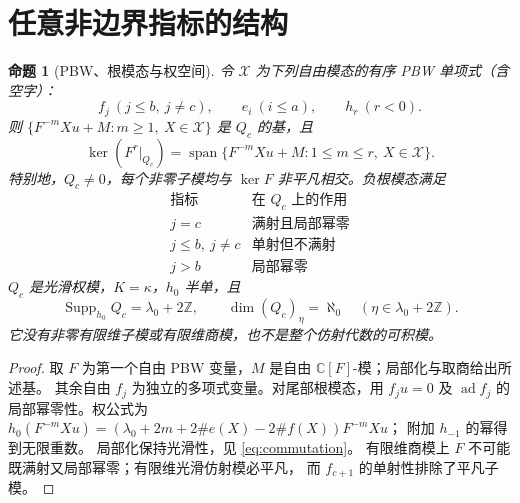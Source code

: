 \documentclass[UTF8,11pt,a4paper,fontset=fandol]{ctexart}
\theoremstyle{upright}
\newtheorem{proposition}[theorem]{命题}
\newcommand{\C}{\mathbb C}
\newcommand{\Z}{\mathbb Z}
\newcommand{\X}{\mathcal X}
\DeclareMathOperator{\ad}{ad}
\DeclareMathOperator{\Span}{span}
\DeclareMathOperator{\Supp}{Supp}
\begin{document}
\section{任意非边界指标的结构}

\begin{proposition}[PBW、根模态与权空间]\label{prop:pbw}
令 $\X$ 为下列自由模态的有序 PBW 单项式（含空字）：
\[
f_j\ (j\le b,\ j\ne c),\qquad e_i\ (i\le a),\qquad h_r\ (r<0).
\]
则 $\{F^{-m}Xu+M:m\ge1,\ X\in\X\}$ 是 $Q_c$ 的基，且
\[
\ker(F^r|_{Q_c})=\Span\{F^{-m}Xu+M:1\le m\le r,\ X\in\X\}.
\]
特别地，$Q_c\ne0$，每个非零子模均与 $\ker F$ 非平凡相交。负根模态满足
\[
\begin{array}{c|c}
\text{指标}&\text{在 }Q_c\text{ 上的作用}\\ \hline
j=c&\text{满射且局部幂零}\\
j\le b,\ j\ne c&\text{单射但不满射}\\
j>b&\text{局部幂零}
\end{array}
\]
$Q_c$ 是光滑权模，$K=\kappa$，$h_0$ 半单，且
\[
\Supp_{h_0}Q_c=\lambda_0+2\Z,
\qquad \dim (Q_c)_\eta=\aleph_0\quad(\eta\in\lambda_0+2\Z).
\]
它没有非零有限维子模或有限维商模，也不是整个仿射代数的可积模。
\end{proposition}
\begin{proof}
取 $F$ 为第一个自由 PBW 变量，$M$ 是自由 $\C[F]$-模；局部化与取商给出所述基。
其余自由 $f_j$ 为独立的多项式变量。对尾部根模态，用 $f_ju=0$ 及
$\ad f_j$ 的局部幂零性。权公式为
$h_0(F^{-m}Xu)=(\lambda_0+2m+2\#e(X)-2\#f(X))F^{-m}Xu$；
附加 $h_{-1}$ 的幂得到无限重数。
局部化保持光滑性，见 \eqref{eq:commutation}。
有限维商模上 $F$ 不可能既满射又局部幂零；有限维光滑仿射模必平凡，
而 $f_{c+1}$ 的单射性排除了平凡子模。
\end{proof}
\end{document}
